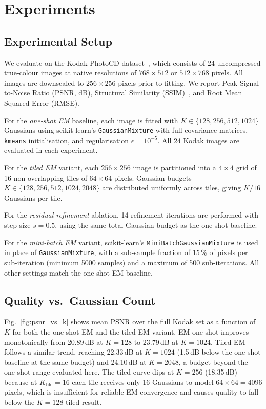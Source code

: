 \documentclass[a4paper,conference]{IEEEtran}
\begin{document}
\section{Experiments}
\label{sec:experiments}

\subsection{Experimental Setup}
\label{subsec:setup}

We evaluate on the Kodak PhotoCD dataset~\cite{kodak}, which consists of 24
uncompressed true-colour images at native resolutions of $768\!\times\!512$ or
$512\!\times\!768$ pixels.
All images are downscaled to $256\!\times\!256$ pixels prior to fitting.
We report Peak Signal-to-Noise Ratio (PSNR, dB), Structural Similarity
(SSIM)~\cite{wang2004ssim}, and Root Mean Squared Error (RMSE).

For the \emph{one-shot EM} baseline, each image is fitted with
$K\!\in\!\{128, 256, 512, 1024\}$ Gaussians using scikit-learn's
\texttt{GaussianMixture} with full covariance matrices, \texttt{kmeans}
initialisation, and regularisation $\epsilon\!=\!10^{-5}$.
All 24 Kodak images are evaluated in each experiment.

For the \emph{tiled EM} variant, each $256\!\times\!256$ image is partitioned
into a $4\!\times\!4$ grid of 16 non-overlapping tiles of $64\!\times\!64$ pixels.
Gaussian budgets $K\!\in\!\{128, 256, 512, 1024, 2048\}$ are distributed
uniformly across tiles, giving $K/16$ Gaussians per tile.

For the \emph{residual refinement} ablation, 14 refinement iterations
are performed with step size $s\!=\!0.5$, using the same total Gaussian
budget as the one-shot baseline.

For the \emph{mini-batch EM} variant, scikit-learn's
\texttt{MiniBatchGaussianMixture} is used in place of
\texttt{GaussianMixture}, with a sub-sample fraction of 15\,\% of pixels
per sub-iteration (minimum 5000 samples) and a maximum of 500 sub-iterations.
All other settings match the one-shot EM baseline.

\subsection{Quality vs.\ Gaussian Count}
\label{subsec:rq}

Fig.~\ref{fig:psnr_vs_k} shows mean PSNR over the full Kodak set as a
function of $K$ for both the one-shot EM and the tiled EM variant.
EM one-shot improves monotonically from 20.89\,dB at $K\!=\!128$ to
23.79\,dB at $K\!=\!1024$.
Tiled EM follows a similar trend, reaching 22.33\,dB at $K\!=\!1024$
(1.5\,dB below the one-shot baseline at the same budget) and 24.10\,dB
at $K\!=\!2048$, a budget beyond the one-shot range evaluated here.
The tiled curve dips at $K\!=\!256$ (18.35\,dB) because at
$K_\mathrm{tile}\!=\!16$ each tile receives only 16 Gaussians to model
$64\!\times\!64\!=\!4096$ pixels, which is insufficient for reliable EM
convergence and causes quality to fall below the $K\!=\!128$ tiled result.
\end{document}
